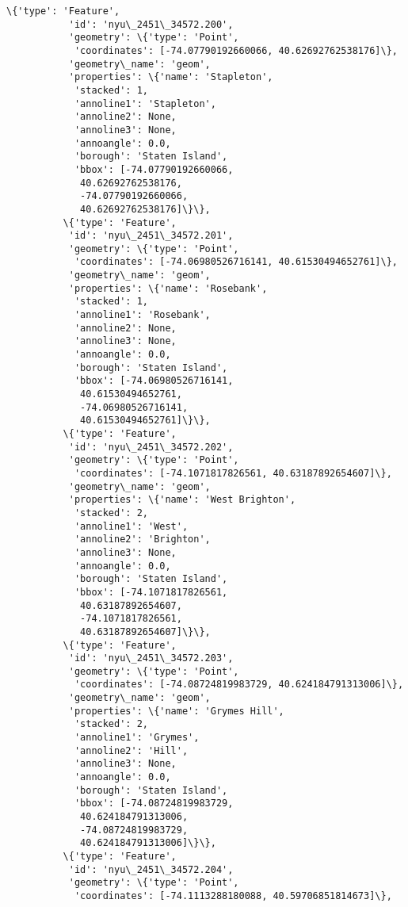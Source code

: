 \documentclass[11pt]{article}
\begin{document}
\begin{Verbatim}[commandchars=\\\{\}]
          \{'type': 'Feature',
           'id': 'nyu\_2451\_34572.200',
           'geometry': \{'type': 'Point',
            'coordinates': [-74.07790192660066, 40.62692762538176]\},
           'geometry\_name': 'geom',
           'properties': \{'name': 'Stapleton',
            'stacked': 1,
            'annoline1': 'Stapleton',
            'annoline2': None,
            'annoline3': None,
            'annoangle': 0.0,
            'borough': 'Staten Island',
            'bbox': [-74.07790192660066,
             40.62692762538176,
             -74.07790192660066,
             40.62692762538176]\}\},
          \{'type': 'Feature',
           'id': 'nyu\_2451\_34572.201',
           'geometry': \{'type': 'Point',
            'coordinates': [-74.06980526716141, 40.61530494652761]\},
           'geometry\_name': 'geom',
           'properties': \{'name': 'Rosebank',
            'stacked': 1,
            'annoline1': 'Rosebank',
            'annoline2': None,
            'annoline3': None,
            'annoangle': 0.0,
            'borough': 'Staten Island',
            'bbox': [-74.06980526716141,
             40.61530494652761,
             -74.06980526716141,
             40.61530494652761]\}\},
          \{'type': 'Feature',
           'id': 'nyu\_2451\_34572.202',
           'geometry': \{'type': 'Point',
            'coordinates': [-74.1071817826561, 40.63187892654607]\},
           'geometry\_name': 'geom',
           'properties': \{'name': 'West Brighton',
            'stacked': 2,
            'annoline1': 'West',
            'annoline2': 'Brighton',
            'annoline3': None,
            'annoangle': 0.0,
            'borough': 'Staten Island',
            'bbox': [-74.1071817826561,
             40.63187892654607,
             -74.1071817826561,
             40.63187892654607]\}\},
          \{'type': 'Feature',
           'id': 'nyu\_2451\_34572.203',
           'geometry': \{'type': 'Point',
            'coordinates': [-74.08724819983729, 40.624184791313006]\},
           'geometry\_name': 'geom',
           'properties': \{'name': 'Grymes Hill',
            'stacked': 2,
            'annoline1': 'Grymes',
            'annoline2': 'Hill',
            'annoline3': None,
            'annoangle': 0.0,
            'borough': 'Staten Island',
            'bbox': [-74.08724819983729,
             40.624184791313006,
             -74.08724819983729,
             40.624184791313006]\}\},
          \{'type': 'Feature',
           'id': 'nyu\_2451\_34572.204',
           'geometry': \{'type': 'Point',
            'coordinates': [-74.1113288180088, 40.59706851814673]\},

\end{Verbatim}
\end{document}
